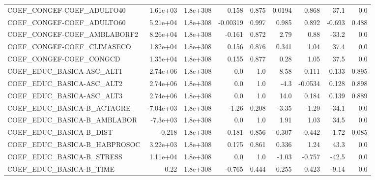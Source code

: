 \begin{tabular}{lrrrrrrrr}
COEF\_CONGEF-COEF\_ADULTO40         &    1.61e+03 &     1.8e+308 &    0.158 &    0.875 &     0.0194 &       0.868 &         37.1 &           0.0 \\
COEF\_CONGEF-COEF\_ADULTO60         &    5.21e+04 &     1.8e+308 & -0.00319 &    0.997 &      0.985 &       0.892 &       -0.693 &         0.488 \\
COEF\_CONGEF-COEF\_AMBLABORF2       &    8.26e+04 &     1.8e+308 &   -0.161 &    0.872 &       2.79 &        0.88 &        -33.2 &           0.0 \\
COEF\_CONGEF-COEF\_CLIMASECO        &    1.82e+04 &     1.8e+308 &    0.156 &    0.876 &      0.341 &        1.04 &         37.4 &           0.0 \\
COEF\_CONGEF-COEF\_CONGCD           &    1.35e+04 &     1.8e+308 &    0.155 &    0.877 &       0.28 &        1.05 &         37.5 &           0.0 \\
COEF\_EDUC\_BASICA-ASC\_ALT1         &    2.74e+06 &     1.8e+308 &      0.0 &      1.0 &       8.58 &       0.111 &        0.133 &         0.895 \\
COEF\_EDUC\_BASICA-ASC\_ALT2         &    2.74e+06 &     1.8e+308 &      0.0 &      1.0 &       -4.3 &     -0.0534 &        0.128 &         0.898 \\
COEF\_EDUC\_BASICA-ASC\_ALT3         &    2.74e+06 &     1.8e+308 &      0.0 &      1.0 &       14.0 &       0.184 &        0.139 &         0.889 \\
COEF\_EDUC\_BASICA-B\_ACTAGRE        &   -7.04e+03 &     1.8e+308 &    -1.26 &    0.208 &      -3.35 &       -1.29 &        -34.1 &           0.0 \\
COEF\_EDUC\_BASICA-B\_AMBLABOR       &    -7.3e+03 &     1.8e+308 &      0.0 &      1.0 &       1.91 &        1.03 &         34.5 &           0.0 \\
COEF\_EDUC\_BASICA-B\_DIST           &      -0.218 &     1.8e+308 &   -0.181 &    0.856 &     -0.307 &      -0.442 &        -1.72 &         0.085 \\
COEF\_EDUC\_BASICA-B\_HABPROSOC      &    3.22e+03 &     1.8e+308 &    0.175 &    0.861 &      0.336 &        1.24 &         43.3 &           0.0 \\
COEF\_EDUC\_BASICA-B\_STRESS         &    1.11e+04 &     1.8e+308 &      0.0 &      1.0 &      -1.03 &      -0.757 &        -42.5 &           0.0 \\
COEF\_EDUC\_BASICA-B\_TIME           &        0.22 &     1.8e+308 &   -0.765 &    0.444 &      0.255 &       0.423 &        -9.14 &           0.0 \\

\end{tabular}
